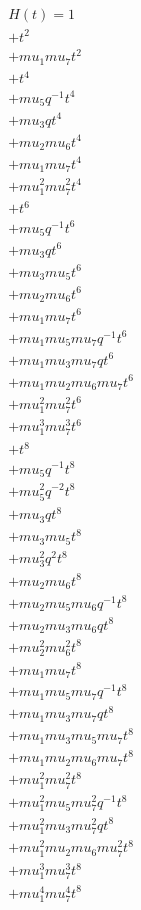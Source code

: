 \begin{align*}
H(t) = {}1 \\
  + t^{2} \\
  + mu_1 mu_7 t^{2} \\
  + t^{4} \\
  + mu_5 q^{-1} t^{4} \\
  + mu_3 q t^{4} \\
  + mu_2 mu_6 t^{4} \\
  + mu_1 mu_7 t^{4} \\
  + mu_1^{2} mu_7^{2} t^{4} \\
  + t^{6} \\
  + mu_5 q^{-1} t^{6} \\
  + mu_3 q t^{6} \\
  + mu_3 mu_5 t^{6} \\
  + mu_2 mu_6 t^{6} \\
  + mu_1 mu_7 t^{6} \\
  + mu_1 mu_5 mu_7 q^{-1} t^{6} \\
  + mu_1 mu_3 mu_7 q t^{6} \\
  + mu_1 mu_2 mu_6 mu_7 t^{6} \\
  + mu_1^{2} mu_7^{2} t^{6} \\
  + mu_1^{3} mu_7^{3} t^{6} \\
  + t^{8} \\
  + mu_5 q^{-1} t^{8} \\
  + mu_5^{2} q^{-2} t^{8} \\
  + mu_3 q t^{8} \\
  + mu_3 mu_5 t^{8} \\
  + mu_3^{2} q^{2} t^{8} \\
  + mu_2 mu_6 t^{8} \\
  + mu_2 mu_5 mu_6 q^{-1} t^{8} \\
  + mu_2 mu_3 mu_6 q t^{8} \\
  + mu_2^{2} mu_6^{2} t^{8} \\
  + mu_1 mu_7 t^{8} \\
  + mu_1 mu_5 mu_7 q^{-1} t^{8} \\
  + mu_1 mu_3 mu_7 q t^{8} \\
  + mu_1 mu_3 mu_5 mu_7 t^{8} \\
  + mu_1 mu_2 mu_6 mu_7 t^{8} \\
  + mu_1^{2} mu_7^{2} t^{8} \\
  + mu_1^{2} mu_5 mu_7^{2} q^{-1} t^{8} \\
  + mu_1^{2} mu_3 mu_7^{2} q t^{8} \\
  + mu_1^{2} mu_2 mu_6 mu_7^{2} t^{8} \\
  + mu_1^{3} mu_7^{3} t^{8} \\
  + mu_1^{4} mu_7^{4} t^{8}
\end{align*}

